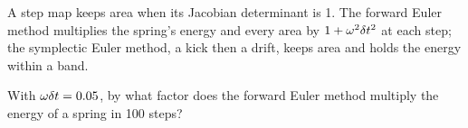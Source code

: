 \begin{keyidea}
A step map keeps area when its Jacobian determinant is 1. The forward Euler
method multiplies the spring's energy and every area by $1 + \omega^2
\delta t^2$ at each step; the symplectic Euler method, a kick then a drift, keeps
area and holds the energy within a band.
\end{keyidea}


\begin{selfcheck}
With $\omega\delta t = 0.05$, by what factor does the forward Euler method
multiply the energy of a spring in 100 steps?
\end{selfcheck}
